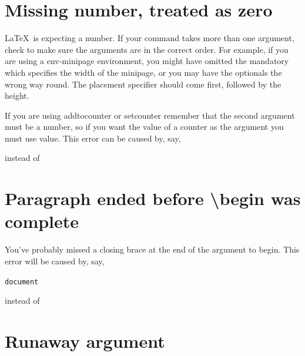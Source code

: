 
\section{Missing number, treated as zero}

\LaTeX\ is expecting a number. If your command takes more than one
\gls{argument}, check to make sure the arguments are in
the correct order.  For example, if you are using a
\gls{env-minipage} environment, you might have
omitted the \gls{mandatory} which
specifies the width of the minipage, or you may have the
\glspl{optional} the wrong way round.  The placement specifier
should come first, followed by the height.

If you are using \gls{addtocounter} or \gls{setcounter} 
remember that the second argument must be a number, so if you want 
the value of a counter as the argument you must use \gls{value}.
This error can be caused by, say,
\begin{alltt}\wrong
{}
\end{alltt}
instead of
\begin{alltt}\correct
{}
\end{alltt}


\section{Paragraph ended before \textbackslash begin was complete}

You've probably missed a closing brace at the end of the argument to
\gls{begin}.  This error will be caused by, say,
\begin{alltt}\wrong
{}document
\end{alltt}
instead of
\begin{alltt}\correct
{}
\end{alltt}


\section{Runaway argument}

